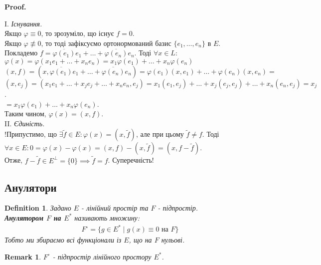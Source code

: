 \documentclass[a4paper, 10pt]{article}
\makeatletter
\theoremstyle{theoremdd}
\newtheorem{definition}[theorem]{Definition}
\newtheorem{remark}[theorem]{Remark}
\renewenvironment{proof}[1][Proof.\\]{\par
\pushQED{\hfill \qed}%
\normalfont \topsep6\p@\@plus6\p@\relax
\trivlist
\item\relax
{\bfseries
#1\@addpunct{.}}\hspace\labelsep\ignorespaces
}{%
\popQED\endtrivlist\@endpefalse
}
\makeatother
\begin{document}
\begin{proof}
I. \textit{Існування.}\\
Якщо $\varphi \equiv 0$, то зрозуміло, що існує $f = 0$.\\
Якщо $\varphi \not\equiv 0$, то тоді зафіксуємо ортонормований базис $\{e_1,\dots,e_n\}$ в $E$. \\ Покладемо $f = \overline{\varphi(e_1)}e_1 + \dots + \overline{\varphi(e_n)}e_n$. Тоді $\forall x \in L:$\\
$\varphi(x) = \varphi(x_1 e_1+\dots+x_n e_n) = x_1 \varphi(e_1) + \dots + x_n \varphi(e_n)$\\
$(x,f) = (x,\overline{\varphi(e_1)}e_1 + \dots + \overline{\varphi(e_n)}e_n) = \varphi(e_1) (x,e_1) + \dots + \varphi(e_n)(x,e_n) \boxed{=}$\\
$(x,e_j) = (x_1 e_1 + \dots + x_j e_j + \dots + x_n e_n, e_j) = x_1 (e_1,e_j) + \dots + x_j (e_j,e_j) + \dots + x_n (e_n,e_j) = x_j$.\\
$\boxed{=} x_1 \varphi(e_1) + \dots + x_n \varphi(e_n)$.\\
Таким чином, $\varphi(x) = (x,f)$.
\bigskip \\
II. \textit{Єдиність.}\\
!Припустимо, що $\exists \tilde{f} \in E: \varphi(x) = (x,\tilde{f})$, але при цьому $\tilde{f} \neq f$. Тоді\\
$\forall x \in E: 0 = \varphi(x) - \varphi(x) = (x,f) - (x,\tilde{f}) = (x,f-\tilde{f})$.\\
Отже, $f-\tilde{f} \in E^\perp = \{0\} \implies \tilde{f} = f$. Суперечність!
\end{proof}

\iffalse
\subsection{Анулятори}
\begin{definition}
Задано $E$ - лінійний простір та $F$ - підпростір.\\
\textbf{Анулятором $F$ на $E^*$} називають множину:
\begin{align*}
F^\circ = \{ g \in E^* \mid g(x) \equiv 0 \text{ на }F \}
\end{align*}
Тобто ми збираємо всі функціонали із $E$, що на $F$ нульові.
\end{definition}

\begin{remark}
$F^\circ$ - підпростір лінійного простору $E^*$.
\end{remark}
\end{document}
